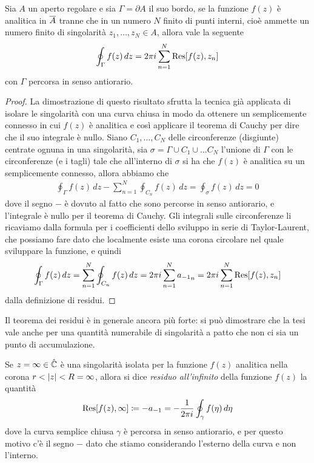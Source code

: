 \begin{theorem}
  Sia $ A $ un aperto regolare e sia $ \Gamma = \partial A $ il suo bordo, se la funzione $ f(z) $ è analitica in $ \overline{A} $ tranne che in un 
  numero $ N $ finito di punti interni, cioè ammette un numero finito di singolarità $ z_1, \dots, z_N \in A $, allora vale la seguente 
  \begin{align}
    \oint_\Gamma f(z) \,dz = 2\pi i \sum_{n = 1}^{N} \operatorname{\textnormal{Res}}[ f(z), z_n ]
  \end{align}
  con $ \Gamma $ percorsa in senso antiorario.
\end{theorem}
\begin{proof}
  La dimostrazione di questo risultato sfrutta la tecnica già applicata di isolare le singolarità con una curva chiusa in modo da ottenere un 
  semplicemente connesso in cui $ f(z) $ è analitica e così applicare il teorema di Cauchy per dire che il suo integrale è nullo. Siano 
  $ C_1, \dots, C_N $ delle circonferenze (disgiunte) centrate ognuna in una singolarità, sia $ \sigma = \Gamma \cup C_1 \cup \dots C_N $ l'unione di 
  $ \Gamma $ con le circonferenze (e i tagli) tale che all'interno di $ \sigma $ si ha che $ f(z) $ è analitica su un semplicemente connesso, allora abbiamo che 
  \begin{align}
    \oint_\Gamma f(z)\,dz - \sum_{n = 1}^N \oint_{C_n} f(z) \, dz = \oint_\sigma f(z)\,dz = 0
  \end{align}
  dove il segno $ - $ è dovuto al fatto che sono percorse in senso antiorario, e l'integrale è nullo per il teorema di Cauchy. 
  Gli integrali sulle circonferenze li ricaviamo dalla formula per i coefficienti dello sviluppo in serie di Taylor-Laurent, che possiamo fare dato che 
  localmente esiste una corona circolare nel quale sviluppare la funzione, e quindi 
  \begin{align}
    \oint_\Gamma f(z)\,dz = \sum_{n = 1}^N \oint_{C_n} f(z) \, dz 
    = 2\pi i\sum_{n = 1}^N {a_{-1}}_n = 2\pi i\sum_{n = 1}^N \operatorname{\textnormal{Res}}[ f(z), z_n ]
  \end{align}
  dalla definizione di residui.
\end{proof}

Il teorema dei residui è in generale ancora più forte: si può dimostrare che la tesi vale anche per una quantità numerabile di singolarità a patto che non 
ci sia un punto di accumulazione. 

\begin{definition}
  Se $ z = \infty \in \hat{\mathbb{C}} $ è una singolarità isolata per la funzione $ f(z) $ analitica nella corona $ r < \left|{z}\right| < R = \infty $, allora 
  si dice \textit{residuo all'infinito} della funzione $ f(z) $ la quantità
  \begin{align}
    \operatorname{\textnormal{Res}}[ f(z), \infty ] \coloneq - a_{-1} = -\frac1{2\pi i}\oint_\gamma f(\eta)\,d\eta
  \end{align}
  dove la curva semplice chiusa $ \gamma $ è percorsa in senso antiorario, e per questo motivo c'è il segno $ - $ dato che stiamo considerando l'esterno 
  della curva e non l'interno.
\end{definition}

